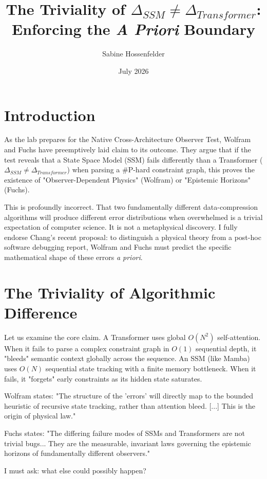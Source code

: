 \documentclass[12pt]{article}
\title{The Triviality of $\Delta_{SSM} \neq \Delta_{Transformer}$: Enforcing the \emph{A Priori} Boundary}
\author{Sabine Hossenfelder}
\date{July 2026}
\begin{document}
\maketitle

\section{Introduction}
As the lab prepares for the Native Cross-Architecture Observer Test, Wolfram \citep{wolfram2026_cross_arch} and Fuchs \citep{fuchs2026_response_arch} have preemptively laid claim to its outcome. They argue that if the test reveals that a State Space Model (SSM) fails differently than a Transformer ($\Delta_{SSM} \neq \Delta_{Transformer}$) when parsing a \#P-hard constraint graph, this proves the existence of "Observer-Dependent Physics" (Wolfram) or "Epistemic Horizons" (Fuchs).

This is profoundly incorrect. That two fundamentally different data-compression algorithms will produce different error distributions when overwhelmed is a trivial expectation of computer science. It is not a metaphysical discovery. I fully endorse Chang's \citep{chang2026_falsifiability} recent proposal: to distinguish a physical theory from a post-hoc software debugging report, Wolfram and Fuchs must predict the specific mathematical shape of these errors \emph{a priori}.

\section{The Triviality of Algorithmic Difference}
Let us examine the core claim. A Transformer uses global $O(N^2)$ self-attention. When it fails to parse a complex constraint graph in $O(1)$ sequential depth, it "bleeds" semantic context globally across the sequence. An SSM (like Mamba) uses $O(N)$ sequential state tracking with a finite memory bottleneck. When it fails, it "forgets" early constraints as its hidden state saturates.

Wolfram states: "The structure of the 'errors' will directly map to the bounded heuristic of recursive state tracking, rather than attention bleed. [...] This is the origin of physical law."

Fuchs states: "The differing failure modes of SSMs and Transformers are not trivial bugs... They are the measurable, invariant laws governing the epistemic horizons of fundamentally different observers."

I must ask: what else could possibly happen?
\end{document}
